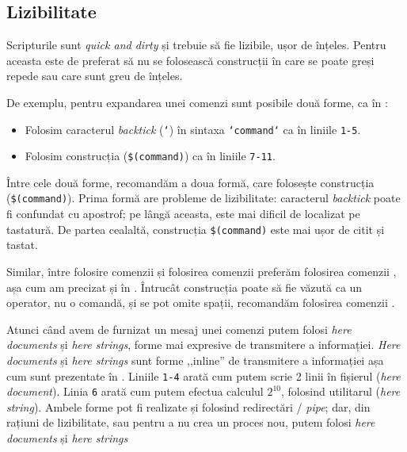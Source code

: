 \subsection{Lizibilitate}
\label{sec:auto:script-advanced:readable}

Scripturile sunt \textit{quick and dirty} și trebuie să fie lizibile, ușor de înțeles.
Pentru aceasta este de preferat să nu se folosească construcții în care se poate greși repede sau care sunt greu de înțeles.

De exemplu, pentru expandarea unei comenzi sunt posibile două forme, ca în :
\begin{itemize}
  \item Folosim caracterul \textit{backtick} (\texttt{`}) în sintaxa \texttt{`command`} ca în liniile \texttt{1-5}.
  \item Folosim construcția (\texttt{\$(command)}) ca în liniile \texttt{7-11}.
\end{itemize}
Între cele două forme, recomandăm a doua formă, care folosește construcția (\texttt{\$(command)}).
Prima formă are probleme de lizibilitate: caracterul \textit{backtick} poate fi confundat cu apostrof; pe lângă aceasta, este mai dificil de localizat pe tastatură.
De partea cealaltă, construcția \texttt{\$(command)} este mai ușor de citit și tastat.


Similar, între folosire comenzii  și folosirea comenzii \cmd{$[$} preferăm folosirea comenzii , așa cum am precizat și în .
Întrucât construcția \cmd{$[$} poate să fie văzută ca un operator, nu o comandă, și se pot omite spații, recomandăm folosirea comenzii .

Atunci când avem de furnizat un mesaj unei comenzi putem folosi \textit{here documents} și \textit{here strings}, forme mai expresive de transmitere a informației.
\textit{Here documents} și \textit{here strings} sunt forme ,,inline'' de transmitere a informației așa cum sunt prezentate în .
Liniile \texttt{1-4} arată cum putem scrie 2 linii în fișierul  (\textit{here document}).
Linia \texttt{6} arată cum putem efectua calculul $2^10$, folosind utilitarul  (\textit{here string}).
Ambele forme pot fi realizate și folosind redirectări / \textit{pipe}; dar, din rațiuni de lizibilitate, sau pentru a nu crea un proces nou, putem folosi \textit{here documents} și \textit{here strings}

